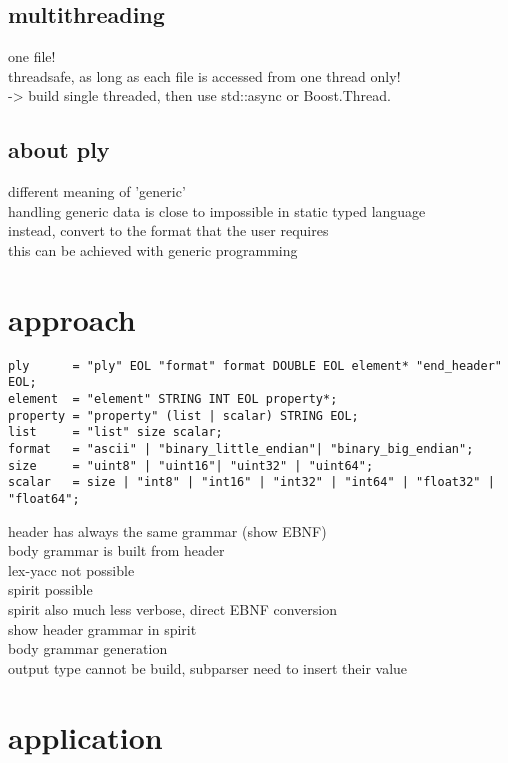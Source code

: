 \documentclass[a4paper,parskip=half]{scrartcl}
\begin{document}
\subsection{multithreading}
%
one file!\\
threadsafe, as long as each file is accessed from one thread only!\\
-> build single threaded, then use std::async or Boost.Thread.\\

\subsection{about ply}
different meaning of 'generic'\\
handling generic data is close to impossible in static typed language\\
instead, convert to the format that the user requires\\
this can be achieved with generic programming\\

\section{approach}
%
\begin{lstlisting}[frame=tb]
ply      = "ply" EOL "format" format DOUBLE EOL element* "end_header" EOL;
element  = "element" STRING INT EOL property*;
property = "property" (list | scalar) STRING EOL;
list     = "list" size scalar;
format   = "ascii" | "binary_little_endian"| "binary_big_endian";
size     = "uint8" | "uint16"| "uint32" | "uint64";
scalar   = size | "int8" | "int16" | "int32" | "int64" | "float32" | "float64";
\end{lstlisting}

header has always the same grammar (show EBNF)\\
body grammar is built from header\\
lex-yacc not possible\\
spirit possible\\
spirit also much less verbose, direct EBNF conversion\\
show header grammar in spirit\\
body grammar generation\\
output type cannot be build, subparser need to insert their value\\

\section{application}
%
\end{document}
